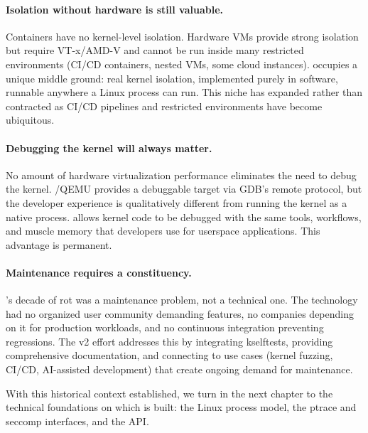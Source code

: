 \paragraph{Isolation without hardware is still valuable.}
Containers have no kernel-level isolation.  Hardware VMs provide strong
isolation but require VT-x/AMD-V and cannot be run inside many restricted
environments (CI/CD containers, nested VMs, some cloud instances).  \UML{}
occupies a unique middle ground: real kernel isolation, implemented purely in
software, runnable anywhere a Linux process can run.  This niche has expanded
rather than contracted as CI/CD pipelines and restricted environments have
become ubiquitous.

\paragraph{Debugging the kernel will always matter.}
No amount of hardware virtualization performance eliminates the need to debug
the kernel.  \KVM{}/QEMU provides a debuggable target via GDB's remote
protocol, but the developer experience is qualitatively different from running
the kernel as a native process.  \UML{} allows kernel code to be debugged with
the same tools, workflows, and muscle memory that developers use for userspace
applications.  This advantage is permanent.

\paragraph{Maintenance requires a constituency.}
\UML{}'s decade of rot was a maintenance problem, not a technical one.  The
technology had no organized user community demanding features, no companies
depending on it for production workloads, and no continuous integration
preventing regressions.  The v2 effort addresses this by integrating kselftests,
providing comprehensive documentation, and connecting \UML{} to use cases
(kernel fuzzing, CI/CD, AI-assisted development) that create ongoing
demand for maintenance.

\bigskip
\noindent
With this historical context established, we turn in the next chapter to the
technical foundations on which \UML{} is built: the Linux process model,
the ptrace and seccomp interfaces, and the \KVM{} API.
